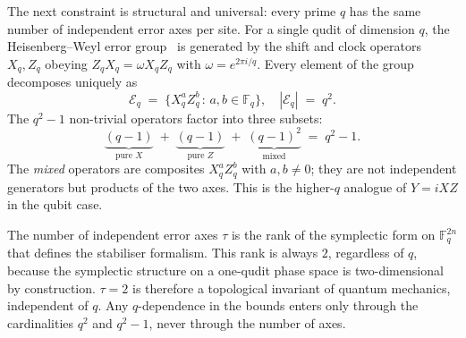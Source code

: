 \documentclass[11pt,a4paper]{article}
\begin{document}
The next constraint is structural and universal: every prime $q$ has the same number of independent error axes per site. For a single qudit of dimension $q$, the Heisenberg--Weyl error group~\cite{Ashikhmin2001} is generated by the shift and clock operators $X_q,Z_q$ obeying $Z_qX_q = \omega X_qZ_q$ with $\omega=e^{2\pi i/q}$. Every element of the group decomposes uniquely as
\begin{equation}
  \mathcal{E}_q \;=\; \{X_q^a Z_q^b \,:\, a,b\in\mathbb{F}_q\},
  \quad |\mathcal{E}_q| \;=\; q^2.
  \label{eq:hw_basis}
\end{equation}
The $q^2-1$ non-trivial operators factor into three subsets:
\begin{equation}
  \underbrace{(q-1)}_{\text{pure }X}
  \;+\; \underbrace{(q-1)}_{\text{pure }Z}
  \;+\; \underbrace{(q-1)^2}_{\text{mixed}}
  \;=\; q^2-1.
  \label{eq:hw_count}
\end{equation}
The \emph{mixed} operators are composites $X_q^aZ_q^b$ with $a,b\neq0$; they are not independent generators but products of the two axes. This is the higher-$q$ analogue of $Y=iXZ$ in the qubit case.

The number of independent error axes $\tau$ is the rank of the symplectic form on $\mathbb{F}_q^{2n}$ that defines the stabiliser formalism. This rank is always $2$, regardless of $q$, because the symplectic structure on a one-qudit phase space is two-dimensional by construction. $\tau=2$ is therefore a topological invariant of quantum mechanics, independent of $q$. Any $q$-dependence in the bounds enters only through the cardinalities $q^2$ and $q^2-1$, never through the number of axes.
\end{document}
